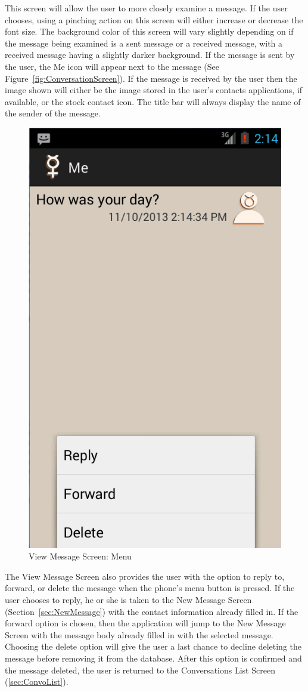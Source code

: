 \documentclass{article}
\begin{document}
\par This screen will allow the user to more closely examine a message. If the user chooses, using a pinching action on this screen will either increase or decrease the font size.
The background color of this screen will vary slightly depending on if the message being examined is a sent message or a received message, with a received message having a slightly darker background.
If the message is sent by the user, the Me icon will appear next to the message (See Figure~\ref{fig:ConversationScreen}).
If the message is received by the user then the image shown will either be the image stored in the user's contacts applications, if available, or the stock contact icon.
The title bar will always display the name of the sender of the message.



\begin{figure}[ht!]
\centering
\includegraphics[width=.25\textwidth]{"./Screen_shots/View_Individual_message_Menu"}{}
\caption{View Message Screen: Menu}
\label{fig:ViewMsgMenu}
\end{figure}


\par The View Message Screen also provides the user with the option to reply to, forward, or delete the message when the phone's menu button is pressed. 
If the user chooses to reply, he or she is taken to the New Message Screen (Section~\ref{sec:NewMessage}) with the contact information already filled in.
 If the forward option is chosen, then the application will jump to the New Message Screen with the message body already filled in with the selected message.
Choosing the delete option will give the user a last chance to decline deleting the message before removing it from the database.
After this option is confirmed and the message deleted, the user is returned to the Conversations List Screen (\autoref{sec:ConvoList}).
\end{document}
